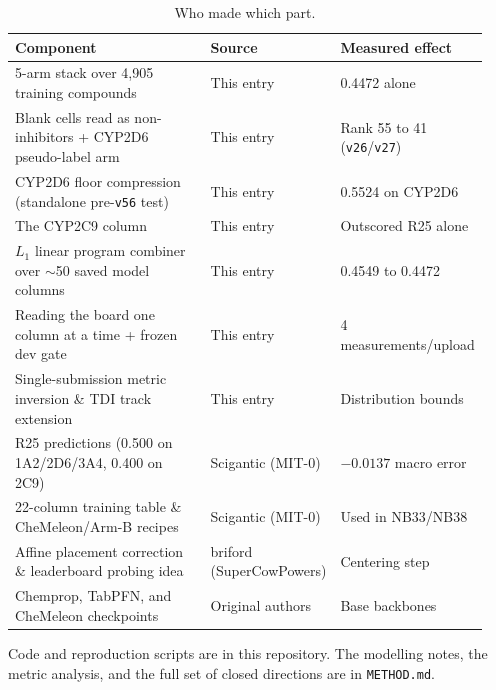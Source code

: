 \documentclass[11pt]{article}
\begin{document}
\begin{table}[H]
\centering
\small
\begin{tabular}{p{0.46\linewidth}p{0.27\linewidth}p{0.21\linewidth}}
\toprule
Component & Source & Measured effect \\
\midrule
5-arm stack over 4,905 training compounds & This entry & 0.4472 alone \\
Blank cells read as non-inhibitors + CYP2D6 pseudo-label arm & This entry & Rank 55 to 41 (\texttt{v26}/\texttt{v27}) \\
CYP2D6 floor compression (standalone pre-\texttt{v56} test) & This entry & 0.5524 on CYP2D6 \\
The CYP2C9 column & This entry & Outscored R25 alone \\
$L_1$ linear program combiner over $\sim$50 saved model columns & This entry & 0.4549 to 0.4472 \\
Reading the board one column at a time + frozen dev gate & This entry & 4 measurements/upload \\
Single-submission metric inversion \& TDI track extension & This entry & Distribution bounds \\
R25 predictions (0.500 on 1A2/2D6/3A4, 0.400 on 2C9) & Scigantic (MIT-0) & $-0.0137$ macro error \\
22-column training table \& CheMeleon/Arm-B recipes & Scigantic (MIT-0) & Used in NB33/NB38 \\
Affine placement correction \& leaderboard probing idea & briford (SuperCowPowers) & Centering step \\
Chemprop, TabPFN, and CheMeleon checkpoints & Original authors & Base backbones \\
\bottomrule
\end{tabular}
\caption{Who made which part.}
\label{tab:credits}
\end{table}

Code and reproduction scripts are in this repository. The modelling notes, the metric analysis, and the full set of closed directions are in \texttt{METHOD.md}.
\end{document}
